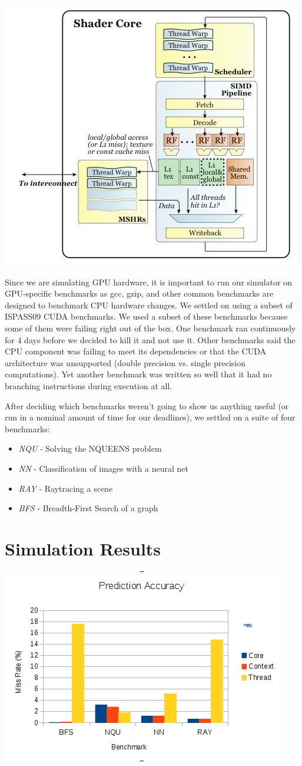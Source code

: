 \documentclass[conference]{IEEEtran}
\begin{document}
\begin{center}
	\includegraphics[width=.45\textwidth]{uarch2.jpg}
\end{center}

Since we are simulating GPU hardware, it is important to run our simulator on GPU-specific benchmarks as gcc, gzip, and other common benchmarks are designed to benchmark CPU hardware changes.  We settled on using a subset of ISPASS09 CUDA benchmarks.  We used a subset of these benchmarks because some of them were failing right out of the box.  One benchmark ran continuously for 4 days before we decided to kill it and not use it.  Other benchmarks said the CPU component was failing to meet its dependencies or that the CUDA architecture was unsupported (double precision vs. single precision computations).  Yet another benchmark was written so well that it had no branching instructions during execution at all.

After deciding which benchmarks weren't going to show us anything useful (or run in a nominal amount of time for our deadlines), we settled on a suite of four benchmarks:

\begin{itemize}
	\item \emph{NQU} - Solving the NQUEENS problem
	\item \emph{NN} - Classification of images with a neural net
	\item \emph{RAY} - Raytracing a scene
	\item \emph{BFS} - Breadth-First Search of a graph
\end{itemize}

\section{Simulation Results}

\begin{center}
	\includegraphics[width=.45\textwidth]{data.png}
\end{center}
\end{document}
